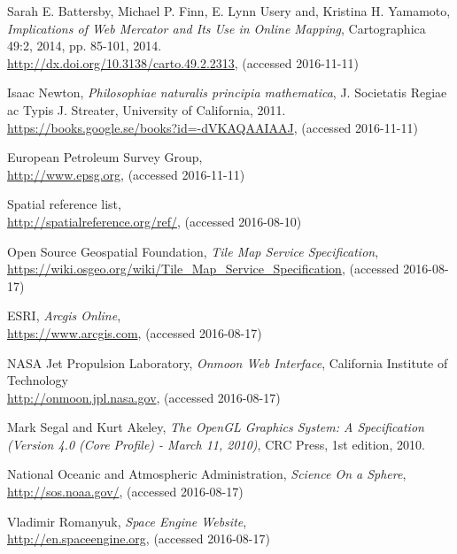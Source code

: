 \begin{thebibliography}{99}
  Sarah E. Battersby, Michael P. Finn, E. Lynn Usery and, Kristina H. Yamamoto,
  \emph{Implications of Web Mercator and Its Use in Online Mapping},
  Cartographica 49:2, 2014, pp. 85-101,
  2014. \\
  \url{http://dx.doi.org/10.3138/carto.49.2.2313},
  (accessed 2016-11-11)

  Isaac Newton,
  \emph{Philosophiae naturalis principia mathematica},
  J. Societatis Regiae ac Typis J. Streater,
  University of California,
  2011. \\
  \url{https://books.google.se/books?id=-dVKAQAAIAAJ},
  (accessed 2016-11-11)
  
  European Petroleum Survey Group,
  \\
  \url{http://www.epsg.org},
  (accessed 2016-11-11)
  
  Spatial reference list,
  \\
  \url{http://spatialreference.org/ref/},
  (accessed 2016-08-10)


  Open Source Geospatial Foundation,
  \emph{Tile Map Service Specification},
  \\
  \url{https://wiki.osgeo.org/wiki/Tile_Map_Service_Specification},
  (accessed 2016-08-17)
  
  ESRI,
  \emph{Arcgis Online},
  \\
  \url{https://www.arcgis.com},
  (accessed 2016-08-17)

  NASA Jet Propulsion Laboratory,
  \emph{Onmoon Web Interface},
  California Institute of Technology
  \\
  \url{http://onmoon.jpl.nasa.gov},
  (accessed 2016-08-17)
  
  Mark Segal and Kurt Akeley,
  \emph{The OpenGL Graphics System: A Specification (Version 4.0 (Core Profile) - March 11, 2010)},
  CRC Press,
  1st edition,
  2010.
  
  National Oceanic and Atmospheric Administration,
  \emph{Science On a Sphere},
  \\
  \url{http://sos.noaa.gov/},
  (accessed 2016-08-17)
  
  Vladimir Romanyuk,
  \emph{Space Engine Website},
  \\
  \url{http://en.spaceengine.org},
  (accessed 2016-08-17)
  

\end{thebibliography}
